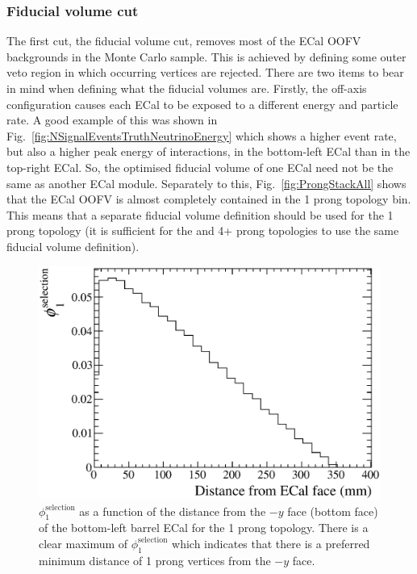 \subsubsection{Fiducial volume cut}
\label{subsubsec:FVCut}
The first cut, the fiducial volume cut, removes most of the ECal OOFV backgrounds in the Monte Carlo sample.  This is achieved by defining some outer veto region in which occurring vertices are rejected.  There are two items to bear in mind when defining what the fiducial volumes are.  Firstly, the off-axis configuration causes each ECal to be exposed to a different energy and particle rate.  A good example of this was shown in Fig.~\ref{fig:NSignalEventsTruthNeutrinoEnergy} which shows a higher event rate, but also a higher peak energy of interactions, in the bottom-left ECal than in the top-right ECal.  So, the optimised fiducial volume of one ECal need not be the same as another ECal module.  Separately to this, Fig.~\ref{fig:ProngStackAll} shows that the ECal OOFV is almost completely contained in the 1 prong topology bin.  This means that a separate fiducial volume definition should be used for the 1 prong topology (it is sufficient for the  and 4+ prong topologies to use the same fiducial volume definition).
\newline
\newline
\begin{figure}
  \centering
  \includegraphics[width=12cm]{images/selection/mc_selection/FV_BLB_1Prong_NegY.eps}
  \caption{$\phi_1^{\textrm{selection}}$ as a function of the distance from the $-y$ face (bottom face) of the bottom-left barrel ECal for the 1 prong topology.  There is a clear maximum of $\phi_1^{\textrm{selection}}$ which indicates that there is a preferred minimum distance of 1 prong vertices from the $-y$ face.}
  \label{fig:FVBLB1ProngNegY}
\end{figure}
